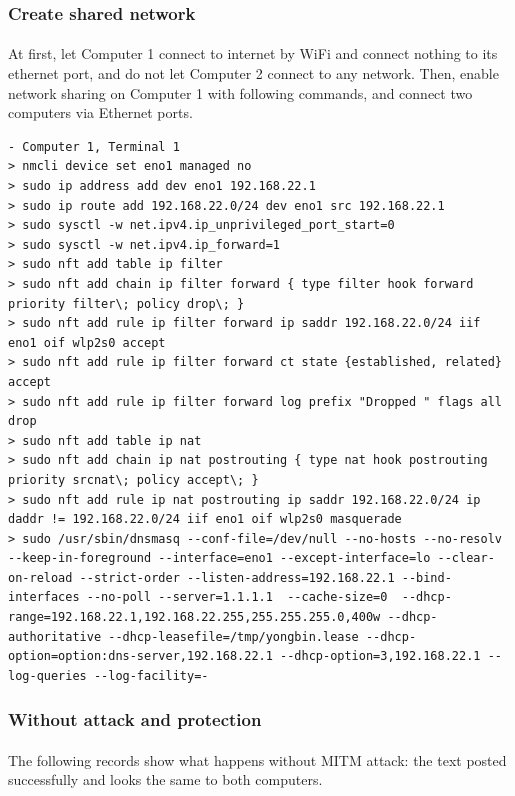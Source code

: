 \documentclass[mscthesis]{usiinfthesis}
\begin{document}
\subsubsection{Create shared network}
\paragraph{}
At first, let Computer 1 connect to internet by WiFi and connect nothing to its ethernet port, and do not let Computer 2 connect to any network. Then, enable network sharing on Computer 1 with following commands, and connect two computers via Ethernet ports.
\begin{lstlisting}[language={},frame=single,breaklines=true,postbreak=\mbox{\textcolor{red}{$\hookrightarrow$}\space}]
- Computer 1, Terminal 1
> nmcli device set eno1 managed no
> sudo ip address add dev eno1 192.168.22.1
> sudo ip route add 192.168.22.0/24 dev eno1 src 192.168.22.1
> sudo sysctl -w net.ipv4.ip_unprivileged_port_start=0
> sudo sysctl -w net.ipv4.ip_forward=1
> sudo nft add table ip filter
> sudo nft add chain ip filter forward { type filter hook forward priority filter\; policy drop\; }
> sudo nft add rule ip filter forward ip saddr 192.168.22.0/24 iif eno1 oif wlp2s0 accept
> sudo nft add rule ip filter forward ct state {established, related} accept
> sudo nft add rule ip filter forward log prefix "Dropped " flags all drop
> sudo nft add table ip nat
> sudo nft add chain ip nat postrouting { type nat hook postrouting priority srcnat\; policy accept\; }
> sudo nft add rule ip nat postrouting ip saddr 192.168.22.0/24 ip daddr != 192.168.22.0/24 iif eno1 oif wlp2s0 masquerade
> sudo /usr/sbin/dnsmasq --conf-file=/dev/null --no-hosts --no-resolv --keep-in-foreground --interface=eno1 --except-interface=lo --clear-on-reload --strict-order --listen-address=192.168.22.1 --bind-interfaces --no-poll --server=1.1.1.1  --cache-size=0  --dhcp-range=192.168.22.1,192.168.22.255,255.255.255.0,400w --dhcp-authoritative --dhcp-leasefile=/tmp/yongbin.lease --dhcp-option=option:dns-server,192.168.22.1 --dhcp-option=3,192.168.22.1 --log-queries --log-facility=-
\end{lstlisting}

\subsubsection{Without attack and protection}
\paragraph{}
The following records show what happens without MITM attack: the text posted successfully and looks the same to both computers.
\end{document}
